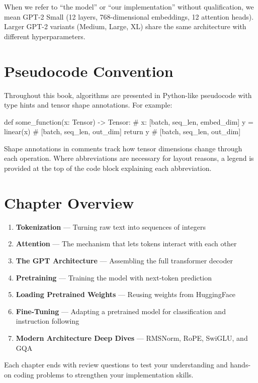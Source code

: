 When we refer to ``the model'' or ``our implementation'' without
qualification, we mean GPT-2 Small (12 layers, 768-dimensional embeddings,
12 attention heads). Larger GPT-2 variants (Medium, Large, XL) share the
same architecture with different hyperparameters.

\section*{Pseudocode Convention}

Throughout this book, algorithms are presented in Python-like pseudocode with type
hints and tensor shape annotations. For example:

\begin{pseudocode}
def some_function(x: Tensor) -> Tensor:  # x: [batch, seq_len, embed_dim]
    y = linear(x)  # [batch, seq_len, out_dim]
    return y        # [batch, seq_len, out_dim]
\end{pseudocode}

Shape annotations in comments track how tensor dimensions change through each
operation. Where abbreviations are necessary for layout reasons, a legend is
provided at the top of the code block explaining each abbreviation.

\section*{Chapter Overview}

\begin{enumerate}
    \item \textbf{Tokenization} --- Turning raw text into sequences of integers
    \item \textbf{Attention} --- The mechanism that lets tokens interact with each other
    \item \textbf{The GPT Architecture} --- Assembling the full transformer decoder
    \item \textbf{Pretraining} --- Training the model with next-token prediction
    \item \textbf{Loading Pretrained Weights} --- Reusing weights from HuggingFace
    \item \textbf{Fine-Tuning} --- Adapting a pretrained model for classification and instruction following
    \item \textbf{Modern Architecture Deep Dives} --- RMSNorm, RoPE, SwiGLU, and GQA
\end{enumerate}

Each chapter ends with review questions to test your understanding and hands-on
coding problems to strengthen your implementation skills.